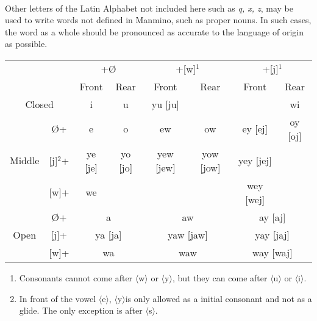 \documentclass{book}
\begin{document}
    \paragraph{}
    Other letters of the Latin Alphabet not included here such as \textit{q, x, z}, may be used to write words not defined in  Manmino, such as proper nouns. In such cases, the word as a whole should be pronounced as accurate to the language of origin as possible. 
    \footnotesize{}
    \begin{center}
    \begin{tabular}{ | c | c | c | c | c | c | c | c | } \hline
    \multicolumn{2}{|c|}{\multirow{2}{*}{}} & \multicolumn{2}{|c|}{+\O} & \multicolumn{2}{|c|}{+[w]$^1$} & \multicolumn{2}{|c|}{+[j]$^1$} \\ \cline{3-8}
    \multicolumn{2}{|c|}{} & Front & Rear & Front & Rear & Front & Rear \\ \hline
    \multicolumn{2}{|c|}{Closed} & i & u & yu [ju] &   &   & wi \\ \hline
    \multirow{3}{*}{Middle} & \O+ & e & o & ew & ow & ey [ej] & oy [oj] \\ \cline{2-8}
    & [j]$^2$+ & ye [je] & yo [jo] & yew [jew] & yow [jow] & yey [jej] &  \\ \cline{2-8}
    & [w]+ & we & & & & wey [wej] & \\ \hline
    \multirow{3}{*}{Open} & \O+ & \multicolumn{2}{|c|}{a} & \multicolumn{2}{|c|}{aw} & \multicolumn{2}{|c|}{ay [aj]} \\ \cline{2-8}
    & [j]+ & \multicolumn{2}{|c|}{ya [ja]} & \multicolumn{2}{|c|}{yaw [jaw]} & \multicolumn{2}{|c|}{yay [jaj]} \\ \cline{2-8}
    & [w]+ & \multicolumn{2}{|c|}{wa} & \multicolumn{2}{|c|}{waw} & \multicolumn{2}{|c|}{way [waj]} \\ \hline
    
    
    \end{tabular} 
    \end{center}
    \begin{enumerate}
      \item Consonants cannot come after $\langle{}$w$\rangle{}$ or $\langle{}$y$\rangle{}$, but they can come after $\langle{}$u$\rangle{}$ or $\langle{}$i$\rangle{}$.
      \item In front of the vowel $\langle{}$e$\rangle{}$,  $\langle{}$y$\rangle{}$is only allowed as a initial consonant and not as a glide. The only exception is after $\langle{}$s$\rangle{}$.
      
    \end{enumerate} 
    \normalsize{}
\end{document}
